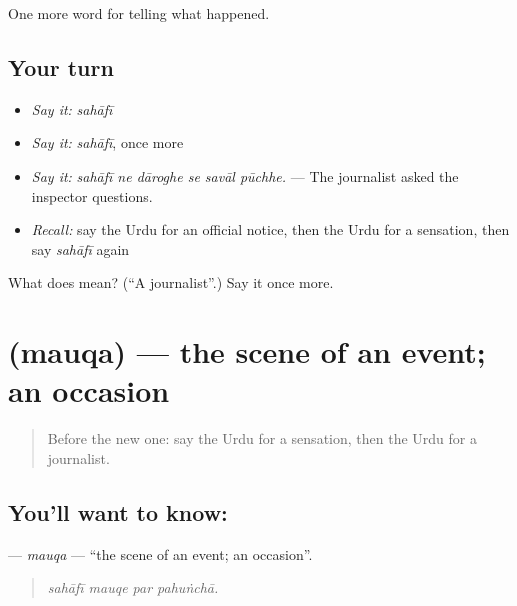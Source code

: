 \begin{grammarlens}[title={What you've built}]
One more word for telling what happened.
\end{grammarlens}

\subsection*{Your turn}
\begin{itemize}
\raggedright
  \item \emph{Say it:} \emph{sahāfī}
  \item \emph{Say it:} \emph{sahāfī}, once more
  \item \emph{Say it:} \emph{sahāfī ne dāroghe se savāl pūchhe.} — The journalist asked the inspector questions.
  \item \emph{Recall:} say the Urdu for an official notice, then the Urdu for a sensation, then say \emph{sahāfī} again
\end{itemize}

\begin{tcolorbox}[breakable,colback=teal!4,colframe=teal!35!black,title={Before you move on}]
What does  mean? (\textquotedblleft{}A journalist\textquotedblright{}.) Say it once more.
\end{tcolorbox}
\section[\texorpdfstring{\ur{موقع} (mauqa)}{موقع (mauqa)}]{ (mauqa) — the scene of an event; an occasion}

\label{lesson:UR-C301-mauqa}



\begin{quote}
Before the new one: say the Urdu for a sensation, then the Urdu for a journalist.
\end{quote}

\subsection*{You'll want to know: }
\textbf{} — \emph{mauqa} — \textquotedblleft{}the scene of an event; an occasion\textquotedblright{}.

\begin{quote}
   
\end{quote}

\begin{quote}
\emph{sahāfī mauqe par pahuṅchā.}
\end{quote}

